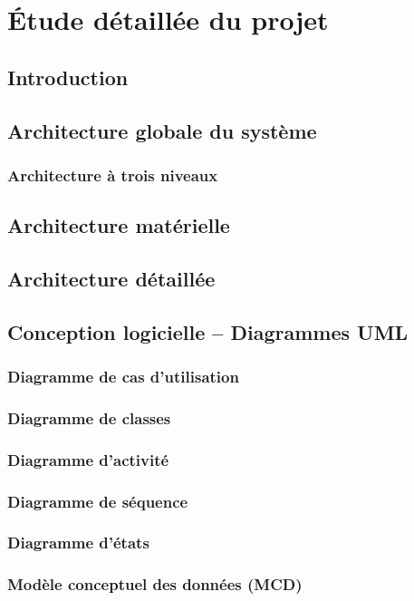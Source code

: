 \documentclass[12pt,a4paper]{report}
\begin{document}
\chapter{Étude détaillée du projet}
\section*{Introduction}
\section{Architecture globale du système}
\subsection{Architecture à trois niveaux}
\section{Architecture matérielle}
\section{Architecture détaillée}
\section{Conception logicielle -- Diagrammes UML}
\subsection{Diagramme de cas d'utilisation}
\subsection{Diagramme de classes}
\subsection{Diagramme d'activité}
\subsection{Diagramme de séquence}
\subsection{Diagramme d'états}
\subsection{Modèle conceptuel des données (MCD)}
\end{document}
